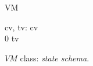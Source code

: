 \begin{figure}[H]
\centering
\begin{class}{VM}
\begin{state}
cv, tv: \integer
{} \leq  cv 
\\
0 \leq  tv 
\end{state} 
\end{class}
\caption{$VM$ class: \textit{state schema}.}
\label{oz_vm_state_schema}
\end{figure}